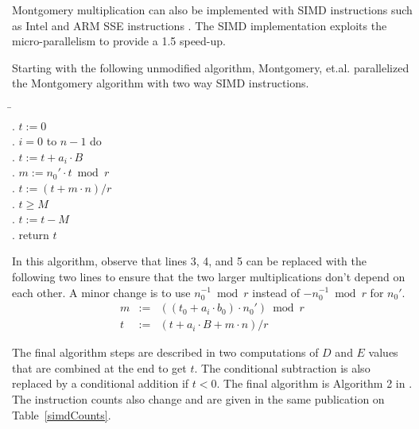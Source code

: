 \documentclass[twocolumn]{svjour3}          %
\begin{document}
Montgomery multiplication can also be implemented with SIMD instructions
such as Intel and ARM SSE instructions \cite{GK12:Software,BMZS13:Montgomery}.
The SIMD implementation exploits the micro-parallelism to provide a 1.5 speed-up.

Starting with the following unmodified algorithm,
Montgomery, et.al. parallelized the Montgomery algorithm with two way SIMD instructions.
%
\begin{tabbing}
\hspace*{0.2in} \= \hspace*{0.5in}\=\\
. $t := 0$ \\
. \bfor $i=0$ to $n-1$ do \\
. \> $t := t + a_i\cdot B$ \\
. \> $m := n_0' \cdot t \bmod r$ \\
. \> $t := (t + m\cdot n)/r$ \\
. \bif $t \geq M$ \bthen \\
. \> $t := t - M$ \\
. return $t$
\end{tabbing}

In this algorithm, observe that lines 3, 4, and 5 can be replaced with the following two lines
to ensure that the two larger multiplications don't depend on each other.
A minor change is to use $n_0^{-1} \bmod r$ instead of $-n_0^{-1} \bmod r$ for $n_0'$.
\begin{eqnarray*}
m & := &  ((t_0 + a_i\cdot b_0)\cdot n_0') \bmod r \\
t  & := & (t + a_i\cdot B + m\cdot n) / r
\end{eqnarray*}

The final algorithm steps are described in two computations of $D$ and $E$ values that are
combined at the end to get $t$. The conditional subtraction is also replaced by a conditional addition if $t<0$.
The final algorithm is Algorithm 2 in \cite{BMZS13:Montgomery}.
The instruction counts also change and are given in the same publication on Table~\ref{simdCounts}.
\end{document}
